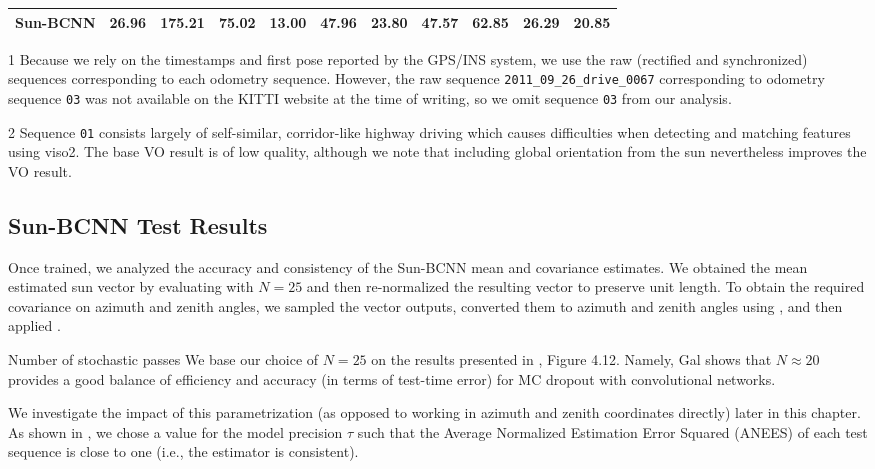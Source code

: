\begin{table}[]
{\begin{threeparttable}
\begin{tabular}{@{}lcccccccccc@{}}
\quad Sun-BCNN    & 26.96          & \textbf{175.21} & 75.02          & 13.00          & \textbf{47.96} & 23.80          & \textbf{47.57} & 62.85          & 26.29          & 20.85          \\ \bottomrule
\end{tabular}
\begin{tablenotes}
	\item[1] Because we rely on the timestamps and first pose reported by the GPS/INS system, we use the raw (rectified and synchronized) sequences corresponding to each odometry sequence. However, the raw sequence \texttt{2011\_09\_26\_drive\_0067} corresponding to odometry sequence \texttt{03} was not available on the KITTI website at the time of writing, so we omit sequence \texttt{03} from our analysis.
    \item[2] Sequence \texttt{01} consists largely of self-similar, corridor-like highway driving which causes difficulties when detecting and matching features using \textsf{viso2}. The base VO result is of low quality, although we note that including global orientation from the sun nevertheless improves the VO result.
\end{tablenotes}
\end{threeparttable}
}
\end{table}

\subsection{Sun-BCNN Test Results}
Once trained, we analyzed the accuracy and consistency of the Sun-BCNN mean and covariance estimates.
We obtained the mean estimated sun vector by evaluating  with $N=25$ and then re-normalized the resulting vector to preserve unit length. 
To obtain the required covariance on azimuth and zenith angles, we sampled the vector outputs, converted them to azimuth and zenith angles using , and then applied .
\begin{remark}{Number of stochastic passes}
We base our choice of $N=25$ on the results presented in \cite{Gal2016UncertaintyThesis}, Figure 4.12. Namely, Gal shows that $N \approx 20$ provides a good balance of efficiency and accuracy (in terms of test-time error) for MC dropout with convolutional networks.
\end{remark}


We investigate the impact of this parametrization (as opposed to working in azimuth and zenith coordinates directly) later in this chapter.
As shown in , we chose a value for the model precision $\tau$ such that the Average Normalized Estimation Error Squared (ANEES) of each test sequence is close to one (i.e., the estimator is consistent).

